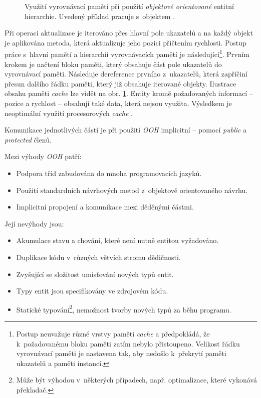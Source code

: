 \begin{figure}[H]
	\centering
	\caption{Využití vyrovnávací paměti při použití \emph{objektově orientované} entitní hierarchie. Uvedený příklad pracuje s~objektem .}
	\label{Fig:OOPCache}
\end{figure}

Při operaci aktualizace je iterováno přes hlavní pole ukazatelů a na každý objekt je aplikována metoda, která aktualizuje jeho pozici přičtením rychlosti. Postup práce s~hlavní pamětí a hierarchií vyrovnávacích pamětí je následující\footnote{Postup neuvažuje různé vrstvy paměti \emph{cache} a předpokládá, že k~požadovanému bloku paměti zatím nebylo přistoupeno. Velikost řádku vyrovnávací paměti je nastavena tak, aby nedošlo k~překrytí paměti ukazatelů a paměti instancí.}. Prvním krokem je načtení bloku paměti, který obsahuje část pole ukazatelů do vyrovnávací paměti. Následuje dereference prvního z~ukazatelů, která zapříčiní přesun dalšího řádku paměti, který již obsahuje iterované objekty. Ilustrace obsahu paměti \emph{cache} lze vidět na obr. \ref{Fig:OOPCache}. Entity kromě požadovaných informací -- pozice a rychlost -- obsahují také data, která nejsou využita. Výsledkem je neoptimální využití procesorových \emph{cache} \cite{DataOrientedDesignDice}.

Komunikace jednotlivých částí je při použití \emph{OOH} implicitní -- pomocí \emph{public} a \emph{protected} členů. 

\noindent Mezi výhody \emph{OOH} patří: 
\begin{itemize}
	\item Podpora tříd zabudována do mnoha programovacích jazyků.
	\item Použití standardních návrhových metod z~objektově orientovaného návrhu.
	\item Implicitní propojení a komunikace mezi děděnými částmi.
\end{itemize}

\noindent Její nevýhody jsou: 
\begin{itemize}
	\item Akumulace stavu a chování, které není nutně entitou vyžadováno.
	\item Duplikace kódu v~různých větvích stromu dědičnosti.
	\item Zvyšující se složitost umisťování nových typů entit.
	\item Typy entit jsou specifikovány ve zdrojovém kódu.
	\item Statické typování\footnote{Může být výhodou v~některých případech, např. optimalizace, které vykonává překladač.}, nemožnost tvorby nových typů za běhu programu.
\end{itemize}

